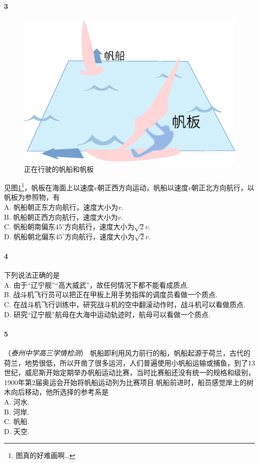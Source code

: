 				\paragraph{3}
					\begin{figure}[hbt]
						\centering
						\includegraphics[scale=0.3]{PIC/001.eps}
						\caption{正在行驶的帆船和帆板}
						\label{Pic::正在行驶的帆船和帆板}
					\end{figure}
					见图\ref{Pic::正在行驶的帆船和帆板}\footnote{图真的好难画啊\ldots }，帆板在海面上以速度$v$朝正西方向运动，帆船以速度$v$朝正北方向航行，以帆板为参照物，有\mathcnl\\
					A. 帆船朝正东方向航行，速度大小为$v$.\\
					B. 帆船朝正西方向航行，速度大小为$v$.\\
					C. 帆船朝南偏东$45^\circ$方向航行，速度大小为$\sqrt{2}v$.\\
					D. 帆船朝北偏东$45^\circ$方向航行，速度大小为$\sqrt{2}v$.\\
				\paragraph{4}
					下列说法正确的是\mathc\\
					A. 由于“辽宁舰”“高大威武”，故任何情况下都不能看成质点.\\
					B. 战斗机飞行员可以把正在甲板上用手势指挥的调度员看做一个质点.\\
					C. 在战斗机飞行训练中，研究战斗机的空中翻滚动作时，战斗机可以看做质点.\\
					D. 研究“辽宁舰”航母在大海中运动轨迹时，航母可以看做一个质点.\\
				\paragraph{5}（\emph{泰州中学高三学情检测}）
					帆船即利用风力前行的船，帆船起源于荷兰，古代的荷兰，地势很低，所以开凿了很多运河，人们普遍使用小帆船运输或捕鱼，到了13世纪，威尼斯开始定期举办帆船运动比赛，当时比赛船还没有统一的规格和级别，1900年第2届奥运会开始将帆船运动列为比赛项目.帆船前进时，船员感觉岸上的树木向后移动，他所选择的参考系是\mathcnl\\
					A. 河水.\\
					B. 河岸.\\
					C. 帆船.\\
					D. 天空.\\
